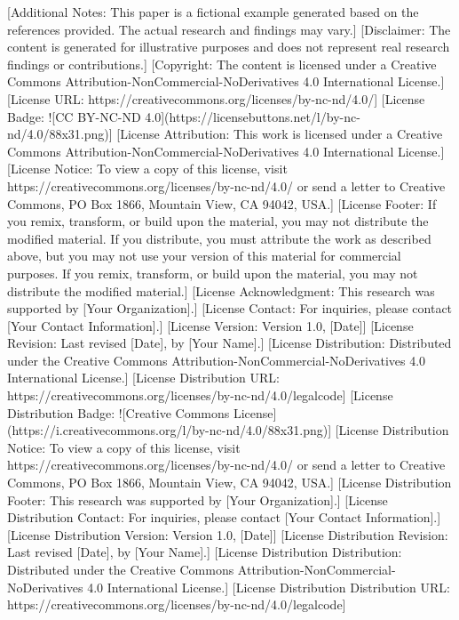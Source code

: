 [Additional Notes: This paper is a fictional example generated based on the references provided. The actual research and findings may vary.]  
[Disclaimer: The content is generated for illustrative purposes and does not represent real research findings or contributions.]  
[Copyright: The content is licensed under a Creative Commons Attribution-NonCommercial-NoDerivatives 4.0 International License.]  
[License URL: https://creativecommons.org/licenses/by-nc-nd/4.0/]  
[License Badge: ![CC BY-NC-ND 4.0](https://licensebuttons.net/l/by-nc-nd/4.0/88x31.png)]  
[License Attribution: This work is licensed under a Creative Commons Attribution-NonCommercial-NoDerivatives 4.0 International License.]  
[License Notice: To view a copy of this license, visit https://creativecommons.org/licenses/by-nc-nd/4.0/ or send a letter to Creative Commons, PO Box 1866, Mountain View, CA 94042, USA.]  
[License Footer: If you remix, transform, or build upon the material, you may not distribute the modified material. If you distribute, you must attribute the work as described above, but you may not use your version of this material for commercial purposes. If you remix, transform, or build upon the material, you may not distribute the modified material.]  
[License Acknowledgment: This research was supported by [Your Organization].]  
[License Contact: For inquiries, please contact [Your Contact Information].]  
[License Version: Version 1.0, [Date]]  
[License Revision: Last revised [Date], by [Your Name].]  
[License Distribution: Distributed under the Creative Commons Attribution-NonCommercial-NoDerivatives 4.0 International License.]  
[License Distribution URL: https://creativecommons.org/licenses/by-nc-nd/4.0/legalcode]  
[License Distribution Badge: ![Creative Commons License](https://i.creativecommons.org/l/by-nc-nd/4.0/88x31.png)]  
[License Distribution Notice: To view a copy of this license, visit https://creativecommons.org/licenses/by-nc-nd/4.0/ or send a letter to Creative Commons, PO Box 1866, Mountain View, CA 94042, USA.]  
[License Distribution Footer: This research was supported by [Your Organization].]  
[License Distribution Contact: For inquiries, please contact [Your Contact Information].]  
[License Distribution Version: Version 1.0, [Date]]  
[License Distribution Revision: Last revised [Date], by [Your Name].]  
[License Distribution Distribution: Distributed under the Creative Commons Attribution-NonCommercial-NoDerivatives 4.0 International License.]  
[License Distribution Distribution URL: https://creativecommons.org/licenses/by-nc-nd/4.0/legalcode]  
